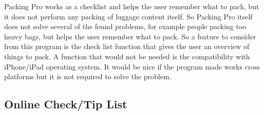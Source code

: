 Packing Pro works as a checklist and helps the user remember what to pack, but it does not perform any packing of luggage content itself. So Packing Pro itself does not solve several of the found problems, for example people packing too heavy bags, but helps the user remember what to pack. So a feature to consider from this program is the check list function that gives the user an overview of things to pack.
A function that would not be needed is the compatibility with iPhone/iPad operating system. It would be nice if the program made works cross platforms but it is not required to solve the problem.






\subsection{Online Check/Tip List}

